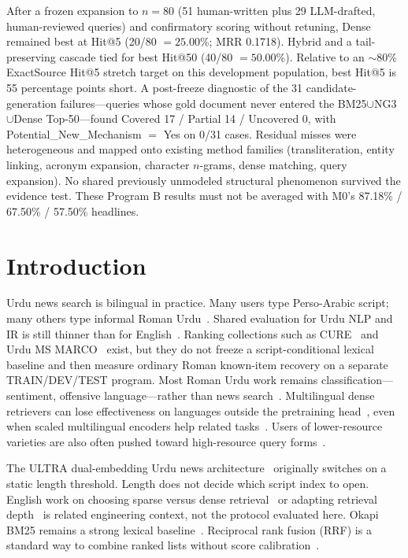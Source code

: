 \documentclass[10pt,letterpaper]{article}
\begin{document}
After a frozen expansion to $n = 80$ (51 human-written plus 29 LLM-drafted, human-reviewed queries) and confirmatory scoring without retuning, Dense remained best at Hit@5 (20/80 $= 25.00\%$; MRR 0.1718). Hybrid and a tail-preserving cascade tied for best Hit@50 (40/80 $= 50.00\%$). Relative to an $\sim$80\% ExactSource Hit@5 stretch target on this development population, best Hit@5 is 55 percentage points short. A post-freeze diagnostic of the 31 candidate-generation failures---queries whose gold document never entered the BM25$\cup$NG3$\cup$Dense Top-50---found Covered 17 / Partial 14 / Uncovered 0, with Potential\_New\_Mechanism $=$ Yes on 0/31 cases. Residual misses were heterogeneous and mapped onto existing method families (transliteration, entity linking, acronym expansion, character $n$-grams, dense matching, query expansion). No shared previously unmodeled structural phenomenon survived the evidence test. These Program B results must not be averaged with M0's 87.18\% / 67.50\% / 57.50\% headlines.


\clearpage
{}
\linenumbers

\section*{Introduction}
Urdu news search is bilingual in practice. Many users type Perso-Arabic script; many others type informal Roman Urdu~\cite{bib1,bib2,bib3}. Shared evaluation for Urdu NLP and IR is still thinner than for English~\cite{bib4}. Ranking collections such as CURE~\cite{bib5} and Urdu MS MARCO~\cite{bib6} exist, but they do not freeze a script-conditional lexical baseline and then measure ordinary Roman known-item recovery on a separate TRAIN/DEV/TEST program. Most Roman Urdu work remains classification---sentiment, offensive language---rather than news search~\cite{bib1,bib2}. Multilingual dense retrievers can lose effectiveness on languages outside the pretraining head~\cite{bib7}, even when scaled multilingual encoders help related tasks~\cite{bib8}. Users of lower-resource varieties are also often pushed toward high-resource query forms~\cite{bib9}.

The ULTRA dual-embedding Urdu news architecture~\cite{bib10} originally switches on a static length threshold. Length does not decide which script index to open. English work on choosing sparse versus dense retrieval~\cite{bib11} or adapting retrieval depth~\cite{bib12} is related engineering context, not the protocol evaluated here. Okapi BM25 remains a strong lexical baseline~\cite{bib13}. Reciprocal rank fusion (RRF) is a standard way to combine ranked lists without score calibration~\cite{bib15}.
\end{document}
